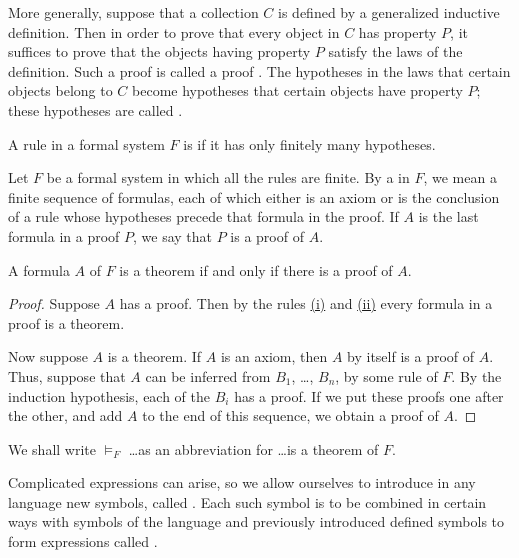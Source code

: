 More generally, suppose that a collection $C$ is defined by a generalized inductive definition.
Then in order to prove that every object in $C$ has property $P$, it suffices to prove that the objects having property $P$ satisfy the laws of the definition.
Such a proof is called a proof .
The hypotheses in the laws that certain objects belong to $C$ become hypotheses that certain objects have property $P$; these hypotheses are called .

A rule in a formal system $F$ is  if it has only finitely many hypotheses.

\begin{shaded*}
Let $F$ be a formal system in which all the rules are finite.
By a  in $F$, we mean a finite sequence of formulas, each of which either is an axiom or is the conclusion of a rule whose hypotheses precede that formula in the proof.
If $A$ is the last formula in a proof $P$, we say that $P$ is a proof of $A$.
\end{shaded*}

\begin{theorem}
A formula $A$ of $F$ is a theorem if and only if there is a proof of $A$.
\end{theorem}

\begin{proof}
Suppose $A$ has a proof.
Then by the rules \hyperref[axioms are theorems]{(i)} and \hyperref[inductions are theorems]{(ii)} every formula in a proof is a theorem.

Now suppose $A$ is a theorem.
If $A$ is an axiom, then $A$ by itself is a proof of $A$.
Thus, suppose that $A$ can be inferred from $B_1$, \ldots, $B_n$, by some rule of $F$.
By the induction hypothesis, each of the $B_i$ has a proof.
If we put these proofs one after the other, and add $A$ to the end of this sequence, we obtain a proof of $A$.
\end{proof}

\begin{remark}
We shall write $\models_F$ \ldots as an abbreviation for \ldots is a theorem of $F$.
\end{remark}

Complicated expressions can arise, so we allow ourselves to introduce in any language new symbols, called .
Each such symbol is to be combined in certain ways with symbols of the language and previously introduced defined symbols to form expressions called .


